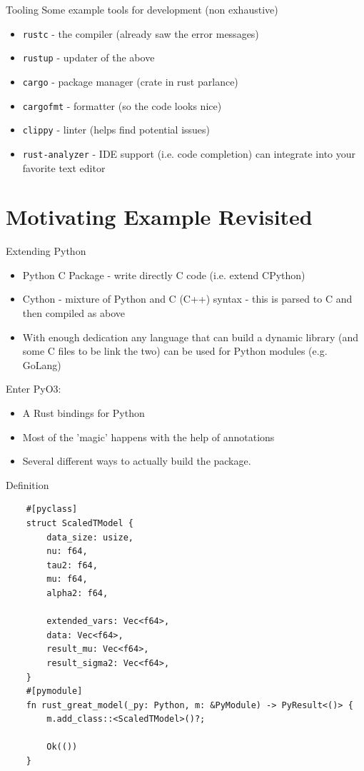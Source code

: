 \documentclass[8pt]{beamer}
\begin{document}
\begin{frame}{Tooling}
Some example tools for development (non exhaustive)
	\begin{itemize}
		\item \texttt{rustc} - the compiler (already saw the error messages)
		\item \texttt{rustup} - updater of the above
		\item \texttt{cargo} - package manager (crate in rust parlance)
		\item \texttt{cargofmt} - formatter (so the code looks nice)
		\item \texttt{clippy} - linter (helps find potential issues)
		\item \texttt{rust-analyzer} - IDE support (i.e. code completion) can integrate into your favorite text editor
	\end{itemize}
\end{frame}

\section{Motivating Example Revisited}
\begin{frame}{Extending Python}
	\begin{itemize}
		\item Python C Package - write directly C code (i.e. extend CPython)
		\item Cython - mixture of Python and C (C++) syntax - this is parsed to C and then compiled as above
		\item With enough dedication any language that can build a dynamic library (and some C files to be link the two) can be used for Python modules (e.g. GoLang)
	\end{itemize}
	\pause
	Enter PyO3:
	\begin{itemize}
		\item A Rust bindings for Python
		\item Most of the 'magic' happens with the help of annotations
		\item Several different ways to actually build the package.
	\end{itemize}
\end{frame}


\begin{frame}[fragile]{Definition}
\begin{verbatim}
	#[pyclass]
	struct ScaledTModel {
		data_size: usize,
		nu: f64,
		tau2: f64,
		mu: f64,
		alpha2: f64,
		
		extended_vars: Vec<f64>,
		data: Vec<f64>,
		result_mu: Vec<f64>,
		result_sigma2: Vec<f64>,
	}
	#[pymodule]
	fn rust_great_model(_py: Python, m: &PyModule) -> PyResult<()> {
		m.add_class::<ScaledTModel>()?;
	
		Ok(())
	}	
\end{verbatim}
\end{frame}
\end{document}
